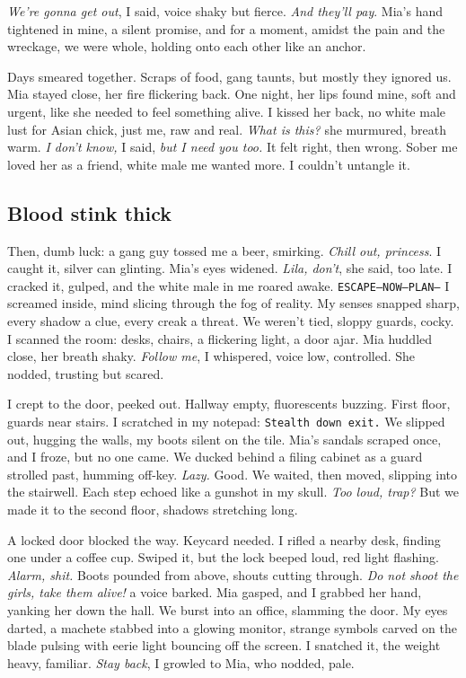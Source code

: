\documentclass[12pt,oneside]{book}
\newcommand{\note}[1]{\texttt{#1}}
\begin{document}
\textit{We’re gonna get out}, I said, voice shaky but fierce. \textit{And they’ll pay}. Mia’s hand tightened in mine, a silent promise, and for a moment, amidst the pain and the wreckage, we were whole, holding onto each other like an anchor.

Days smeared together. Scraps of food, gang taunts, but mostly they ignored us. Mia stayed close, her fire flickering back. One night, her lips found mine, soft and urgent, like she needed to feel something alive. I kissed her back, no white male lust for Asian chick, just me, raw and real. \textit{What is this?} she murmured, breath warm. \textit{I don’t know,} I said, \textit{but I need you too.} It felt right, then wrong. Sober me loved her as a friend, white male me wanted more. I couldn’t untangle it.

\subsection*{Blood stink thick}

Then, dumb luck: a gang guy tossed me a beer, smirking. \textit{Chill out, princess}. I caught it, silver can glinting. Mia’s eyes widened. \textit{Lila, don’t}, she said, too late. I cracked it, gulped, and the white male in me roared awake. \note{ESCAPE—NOW—PLAN—} I screamed inside, mind slicing through the fog of reality. My senses snapped sharp, every shadow a clue, every creak a threat. We weren’t tied, sloppy guards, cocky. I scanned the room: desks, chairs, a flickering light, a door ajar. Mia huddled close, her breath shaky. \textit{Follow me}, I whispered, voice low, controlled. She nodded, trusting but scared.

I crept to the door, peeked out. Hallway empty, fluorescents buzzing. First floor, guards near stairs. I scratched in my notepad: \note{Stealth down exit.} We slipped out, hugging the walls, my boots silent on the tile. Mia’s sandals scraped once, and I froze, but no one came. We ducked behind a filing cabinet as a guard strolled past, humming off-key. \textit{Lazy.} Good. We waited, then moved, slipping into the stairwell. Each step echoed like a gunshot in my skull. \textit{Too loud, trap?} But we made it to the second floor, shadows stretching long.

A locked door blocked the way. Keycard needed. I rifled a nearby desk, finding one under a coffee cup. Swiped it, but the lock beeped loud, red light flashing. \textit{Alarm, shit.} Boots pounded from above, shouts cutting through. \textit{Do not shoot the girls, take them alive!} a voice barked. Mia gasped, and I grabbed her hand, yanking her down the hall. We burst into an office, slamming the door. My eyes darted, a machete stabbed into a glowing monitor, strange symbols carved on the blade pulsing with eerie light bouncing off the screen. I snatched it, the weight heavy, familiar. \textit{Stay back}, I growled to Mia, who nodded, pale.
\end{document}
